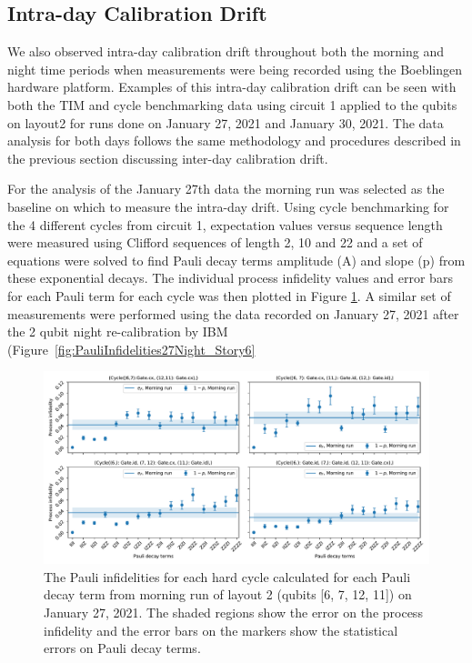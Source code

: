 


\subsection{Intra-day Calibration Drift}
\label{intra-day-analysis}

We also observed intra-day calibration drift throughout both the morning and night time periods when measurements were being recorded using the Boeblingen hardware platform.  Examples of this intra-day calibration drift can be seen with both the TIM and cycle benchmarking data using circuit 1 applied to the qubits on layout2 for runs done on January 27, 2021 and January 30, 2021.  The data analysis for both days follows the same methodology and procedures described in the previous section discussing inter-day calibration drift.  

For the analysis of the January 27th data the morning run was selected as the baseline on which to measure the intra-day drift.  Using cycle benchmarking for the 4 different cycles from circuit 1, expectation values versus sequence length were measured using Clifford sequences of length 2, 10 and 22 and a set of equations were solved to find Pauli decay terms amplitude (A) and slope (p) from these exponential decays.  The individual process infidelity values and error bars for each Pauli term for each cycle was then plotted in Figure \ref{fig:PauliInfidelities27Morning_Story6}.   A similar set of measurements were performed using the data recorded on January 27, 2021 after the 2 qubit night re-calibration by IBM (Figure~\ref{fig:PauliInfidelities27Night_Story6}


\begin{figure}[htpb]
    \includegraphics[scale=0.56]{CBPauliInfidelities_27_01_2021_MorningRun_Layout2_Cycle1_2_3_4.pdf}
    \caption{The Pauli infidelities for each hard cycle calculated for each Pauli decay term from morning run of layout 2 (qubits [6, 7, 12, 11]) on January 27, 2021. The shaded regions show the error on the process infidelity and the error bars on the markers show the statistical errors on Pauli decay terms. }
    \label{fig:PauliInfidelities27Morning_Story6}
\end{figure}

